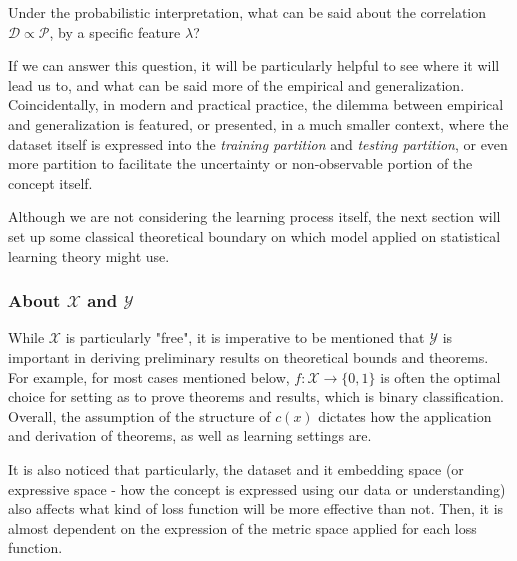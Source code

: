 \begin{question}
    Under the probabilistic interpretation, what can be said about the correlation $\mathcal{D}\propto \mathcal{P}$, by a specific feature $\lambda$?
\end{question}

If we can answer this question, it will be particularly helpful to see where it will lead us to, and what can be said more of the empirical and generalization. Coincidentally, in modern and practical practice, the dilemma between empirical and generalization is featured, or presented, in a much smaller context, where the dataset itself is expressed into the \textit{training partition} and \textit{testing partition}, or even more partition to facilitate the uncertainty or non-observable portion of the concept itself. 

Although we are not considering the learning process itself, the next section will set up some classical theoretical boundary on which model applied on statistical learning theory might use. 
\subsubsection{About $\mathcal{X}$ and $\mathcal{Y}$}
While $\mathcal{X}$ is particularly "free", it is imperative to be mentioned that $\mathcal{Y}$ is important in deriving preliminary results on theoretical bounds and theorems. For example, for most cases mentioned below, $f: \mathcal{X}\to \{0,1\}$ is often the optimal choice for setting as to prove theorems and results, which is binary classification. Overall, the assumption of the structure of $c(x)$ dictates how the application and derivation of theorems, as well as learning settings are. 

It is also noticed that particularly, the dataset and it embedding space (or expressive space - how the concept is expressed using our data or understanding) also affects what kind of loss function will be more effective than not. Then, it is almost dependent on the expression of the metric space applied for each loss function. 

